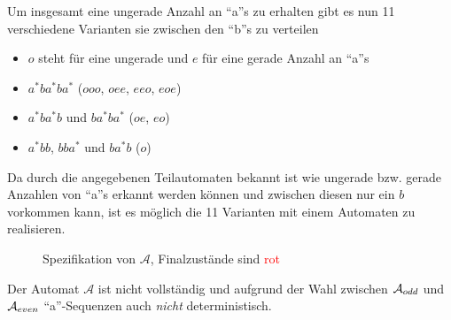 \documentclass{scrartcl}
\begin{document}
Um insgesamt eine ungerade Anzahl an \enquote{a}s zu erhalten gibt es nun 11 verschiedene Varianten sie zwischen den \enquote{b}s zu verteilen
\begin{itemize}
    \item $o$ steht für eine ungerade und $e$ für eine gerade Anzahl an \enquote{a}s
    \item $a^*ba^*ba^*$ ($ooo$, $oee$, $eeo$, $eoe$)
    \item $a^*ba^*b$ und $ba^*ba^*$ ($oe$, $eo$)
    \item $a^*bb$, $bba^*$ und $ba^*b$ ($o$)
\end{itemize}

Da durch die angegebenen Teilautomaten bekannt ist wie ungerade bzw. gerade Anzahlen von \enquote{a}s erkannt werden können und zwischen diesen nur ein $b$ vorkommen kann, ist es möglich die 11 Varianten mit einem Automaten zu realisieren.

\begin{figure}[ht]
\centering
{}
\caption*{Spezifikation von $\mathcal{A}$, Finalzustände sind \textcolor{red}{rot}}
\end{figure}

Der Automat $\mathcal{A}$ ist nicht vollständig und aufgrund der Wahl zwischen $\mathcal{A}_{odd}$ und $\mathcal{A}_{even}$ \enquote{a}-Sequenzen auch \emph{nicht} deterministisch.
\end{document}
